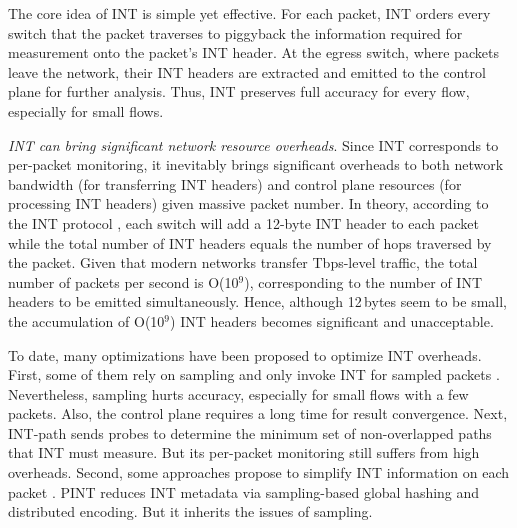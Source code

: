 The core idea of INT is simple yet effective. For each packet, INT orders every switch that the packet traverses to piggyback the information required for measurement onto the packet's INT header. At the egress switch, where packets leave the network, their INT headers are extracted and emitted to the control plane for further analysis. Thus, INT preserves full accuracy for every flow, especially for small flows. 

 \emph{INT can bring significant network resource overheads}. Since INT corresponds to per-packet monitoring, it inevitably brings significant overheads to both network bandwidth (for transferring INT headers) and control plane resources (for processing INT headers) given massive packet number. In theory, according to the INT protocol \cite{int}, each switch will add a 12-byte INT header to each packet while the total number of INT headers equals the number of hops traversed by the packet. Given that modern networks transfer Tbps-level traffic, the total number of packets per second is O(10$^9$), corresponding to the number of INT headers to be emitted simultaneously. Hence, although 12\,bytes seem to be small, the accumulation of O(10$^9$) INT headers becomes significant and unacceptable. 


To date, many optimizations have been proposed to optimize INT overheads. First, some of them rely on sampling and only invoke INT for sampled packets \cite{tang2019sel,suh2020flexible,kim2018selective,ben2020pint}. Nevertheless, sampling hurts accuracy, especially for small flows with a few packets. Also, the control plane requires a long time for result convergence. Next, INT-path \cite{pan2019int} sends probes to determine the minimum set of non-overlapped paths that INT must measure. But its per-packet monitoring still suffers from high overheads. 
%
Second, some approaches propose to simplify INT information on each packet \cite{ben2020pint,zhao2021lightguardian,sheng2021deltaint}. PINT \cite{ben2020pint} reduces INT metadata via sampling-based global hashing and distributed encoding. But it inherits the issues of sampling. 

